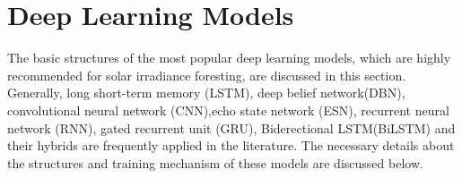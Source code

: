 \documentclass[a4paper,fleqn]{cas-sc}
\begin{document}

\section{Deep Learning Models}
The basic structures of the most popular deep learning models, which are highly recommended for solar irradiance foresting, are discussed in this section. Generally, long short-term memory (LSTM), deep belief network(DBN), convolutional neural network (CNN),echo state network (ESN), recurrent neural network (RNN), gated recurrent unit (GRU), Biderectional LSTM(BiLSTM) and their hybrids are frequently applied in the literature. The necessary details about the structures and training mechanism of these models are discussed below.
\end{document}
